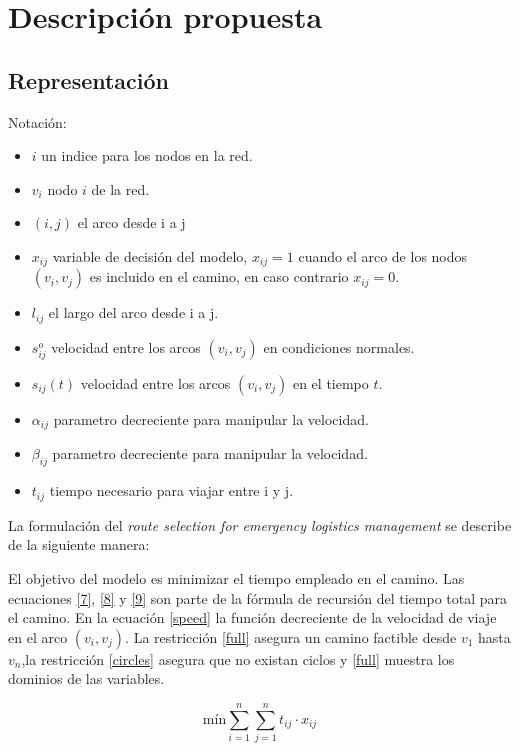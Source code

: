 \section{Descripción propuesta}
\subsection{Representación}
Notación:
\begin{itemize}
	\item $i$ un indice para los nodos en la red.
	\item $v_i$ nodo $i$ de la red.
 	\item $(i,j)$ el arco desde i a j
	\item $x_{ij}$ variable de decisión del modelo, $x_{ij} = 1 $ cuando el arco de los nodos $(v_i,v_j)$ es incluido en el camino, en caso contrario $x_{ij} = 0$.
	\item $l_{ij}$ el largo del arco desde i a j.                                
	\item $s^{o}_{ij}$  velocidad entre los arcos $(v_i, v_j)$ en condiciones normales.
	\item $s_{ij}(t)$ velocidad entre los arcos $(v_i, v_j)$ en el tiempo $t$.        
	\item $\alpha_{ij}$ parametro decreciente para manipular la velocidad.              
	\item $\beta_{ij}$ parametro decreciente para manipular la velocidad.             
	\item $t_{ij}$ tiempo necesario para viajar entre i y j.                      
\end{itemize}

La formulación del \textit{route selection for emergency logistics management} se describe de la siguiente manera:

El objetivo del modelo es minimizar el tiempo empleado en el camino. Las ecuaciones \eqref{7}, \eqref{8} y \eqref{9} son parte de la fórmula de recursión del tiempo total para el camino. En la ecuación \eqref{speed} la función decreciente de la velocidad de viaje en el arco $(v_i,v_j)$. La restricción \eqref{full} asegura un camino factible desde $v_1$ hasta $v_n$,la restricción \eqref{circles} asegura que no existan ciclos y \eqref{full} muestra los dominios de las variables.

\begin{equation}
	 \text{mín} \sum_{i=1}^{n}\sum_{j=1}^{n} t_{ij} \cdot x_{ij}
\end{equation}

